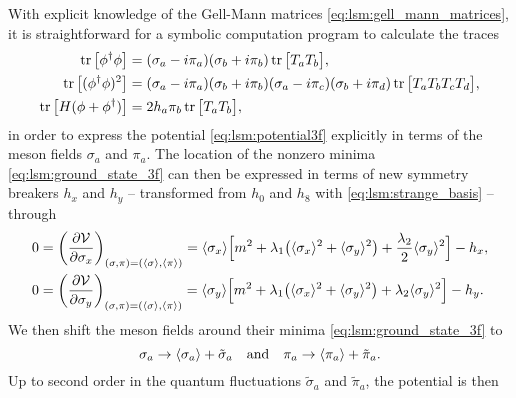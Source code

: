 With explicit knowledge of the Gell-Mann matrices \eqref{eq:lsm:gell_mann_matrices},
it is straightforward for a symbolic computation program to calculate the traces
\begin{subequations}
\begin{align}
	\operatorname{tr}\big[\phi^\dagger \phi\big]     &= (\sigma_a - i \pi_a) (\sigma_b + i \pi_b) \operatorname{tr} \big[ T_a T_b \big], \\
	\operatorname{tr}\big[(\phi^\dagger \phi)^2\big] &= (\sigma_a - i \pi_a) (\sigma_b + i \pi_b) (\sigma_a - i \pi_c) (\sigma_b + i \pi_d) \operatorname{tr} \big[ T_a T_b T_c T_d \big], \\
	\operatorname{tr}\big[H(\phi+\phi^\dagger)\big]  &= 2 h_a \pi_b \operatorname{tr} \big[ T_a T_b \big] ,
\end{align}
\end{subequations}
in order to express the potential \eqref{eq:lsm:potential3f} explicitly in terms of the meson fields $\sigma_a$ and $\pi_a$.
The location of the nonzero minima \eqref{eq:lsm:ground_state_3f} can then be expressed in terms of new symmetry breakers $h_x$ and $h_y$ -- transformed from $h_0$ and $h_8$ with \eqref{eq:lsm:strange_basis} -- through
\begin{subequations}
\begin{align}
	0 &= \pdv{\mathcal{V}}{\sigma_x}_{(\sigma,\pi)=(\langle \sigma \rangle,\langle \pi \rangle)} = \langle \sigma_x \rangle \Big[ m^2 + \lambda_1 \big( \langle \sigma_x \rangle^2 + \langle \sigma_y \rangle^2 \big) + \frac{\lambda_2}{2} \langle \sigma_y \rangle^2 \Big] - h_x, \\
	0 &= \pdv{\mathcal{V}}{\sigma_y}_{(\sigma,\pi)=(\langle \sigma \rangle,\langle \pi \rangle)} = \langle \sigma_y \rangle \Big[ m^2 + \lambda_1 \big( \langle \sigma_x \rangle^2 + \langle \sigma_y \rangle^2 \big) + \lambda_2 \langle \sigma_y \rangle^2 \Big] - h_y.
\end{align}
\label{eq:lsm3f:symmetry_breakers}%
\end{subequations}
We then shift the meson fields around their minima \eqref{eq:lsm:ground_state_3f} to
\begin{equation}
	\sigma_a \rightarrow \langle \sigma_a \rangle + \tilde{\sigma}_a
	\quad \text{and} \quad
	\pi_a \rightarrow \langle \pi_a \rangle + \tilde{\pi}_a.
\end{equation}
Up to second order in the quantum fluctuations $\tilde{\sigma}_a$ and $\tilde{\pi}_a$, the potential is then
